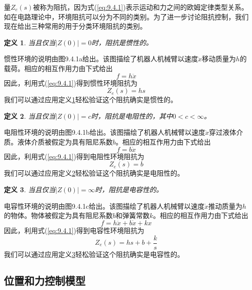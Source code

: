 \documentclass[12pt,a4paper]{ctexart}
\newtheorem{definition}{定义}[section]
\begin{document}
量$Z_e(s)$被称为阻抗，因为式(\ref{eq:9.4.1})表示运动和力之间的欧姆定律类型关系。如在电路理论中，环境阻抗可以分为不同的类别。为了进一步讨论阻抗控制，我们现在给出三种常用的用于分类环境阻抗的类别。

\begin{definition}\label{def:9.4.1}
当且仅当$|Z(0)| = 0$时，阻抗是惯性的。
\end{definition}

惯性环境的说明由图9.4.1a给出。该图描绘了机器人机械臂以速度$\dot{x}$移动质量为$h$的载荷。相应的相互作用力由下式给出
\[
f = h\ddot{x}
\]
因此，利用式(\ref{eq:9.4.1})得到惯性环境阻抗为
\begin{equation}\label{eq:9.4.2}
Z_e(s) = hs
\end{equation}
我们可以通过应用定义\ref{def:9.4.1}轻松验证这个阻抗确实是惯性的。

\begin{definition}\label{def:9.4.2}
当且仅当$|Z(0)| = c$时，阻抗是电阻性的，其中$0 < c < \infty$。
\end{definition}

电阻性环境的说明由图9.4.1b给出。该图描绘了机器人机械臂以速度$\dot{x}$穿过液体介质。液体介质被假定为具有阻尼系数$b$。相应的相互作用力由下式给出
\[
f = b\dot{x}
\]
因此，利用式(\ref{eq:9.4.1})得到电阻性环境阻抗为
\begin{equation}\label{eq:9.4.3}
Z_e(s) = b
\end{equation}
我们可以通过应用定义\ref{def:9.4.2}轻松验证这个阻抗确实是电阻性的。

\begin{definition}\label{def:9.4.3}
当且仅当$|Z(0)| = \infty$时，阻抗是电容性的。
\end{definition}

电容性环境的说明由图9.4.1c给出。该图描绘了机器人机械臂以速度$\dot{x}$推动质量为$h$的物体。物体被假定为具有阻尼系数$b$和弹簧常数$k$。相应的相互作用力由下式给出
\[
f = h\ddot{x} + b\dot{x} + kx
\]
因此，利用式(\ref{eq:9.4.1})得到电容性环境阻抗为
\begin{equation}\label{eq:9.4.4}
Z_e(s) = hs + b + \frac{k}{s}
\end{equation}
我们可以通过应用定义\ref{def:9.4.3}轻松验证这个阻抗确实是电容性的。

\subsection{位置和力控制模型}
\end{document}
